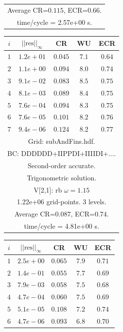 \begin{table}[hbt]
\begin{center}
{\begin{tabular}{|c|c|c|c|c|}
\multicolumn{5}{|c|}{Average CR=$0.115$, ECR=$0.66$.}  \\
\multicolumn{5}{|c|}{time/cycle = 2.57e+00 s.}  \\
\hline 
\end{tabular}
\begin{tabular}{|c|c|c|c|c|} \hline 
 $i$   & $\vert\vert \mbox{res}\vert\vert_\infty$  &  CR     &  WU    & ECR  \\   \hline 
 $ 1$  & $ 1.2e+01$ & $0.045$ & $ 7.1$ & $0.64$ \\ 
 $ 2$  & $ 1.1e+00$ & $0.094$ & $ 8.0$ & $0.74$ \\ 
 $ 3$  & $ 9.1e-02$ & $0.083$ & $ 8.5$ & $0.75$ \\ 
 $ 4$  & $ 8.1e-03$ & $0.089$ & $ 8.4$ & $0.75$ \\ 
 $ 5$  & $ 7.6e-04$ & $0.094$ & $ 8.3$ & $0.75$ \\ 
 $ 6$  & $ 7.6e-05$ & $0.101$ & $ 8.2$ & $0.76$ \\ 
 $ 7$  & $ 9.4e-06$ & $0.124$ & $ 8.2$ & $0.77$ \\ 
\hline 
\multicolumn{5}{|c|}{Grid: subAndFins.hdf.}  \\
\multicolumn{5}{|c|}{BC: DDDDDD+IIPPDI+IIIIDI+....}  \\
\multicolumn{5}{|c|}{Second-order accurate.}  \\
\multicolumn{5}{|c|}{Trigonometric solution.}  \\
\multicolumn{5}{|c|}{V[2,1]: rb $\omega=1.15$}  \\
\multicolumn{5}{|c|}{1.22e+06 grid-points. 3 levels.}  \\
\multicolumn{5}{|c|}{Average CR=$0.087$, ECR=$0.74$.}  \\
\multicolumn{5}{|c|}{time/cycle = 4.81e+00 s.}  \\
\hline 
\end{tabular}
\begin{tabular}{|c|c|c|c|c|} \hline 
 $i$   & $\vert\vert\mbox{res}\vert\vert_\infty$  &  CR     &  WU    & ECR  \\   \hline 
 $ 1$  & $ 2.5e+00$ & $0.065$ & $ 7.9$ & $0.71$ \\ 
 $ 2$  & $ 1.4e-01$ & $0.055$ & $ 7.7$ & $0.69$ \\ 
 $ 3$  & $ 7.9e-03$ & $0.058$ & $ 7.5$ & $0.68$ \\ 
 $ 4$  & $ 4.7e-04$ & $0.060$ & $ 7.5$ & $0.69$ \\ 
 $ 5$  & $ 5.1e-05$ & $0.108$ & $ 7.2$ & $0.74$ \\ 
 $ 6$  & $ 4.7e-06$ & $0.093$ & $ 6.8$ & $0.70$ \\ 

\end{tabular}}
\end{center}
\end{table}
